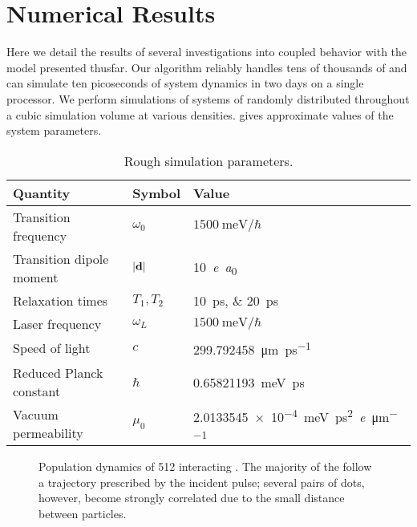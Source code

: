 \section{Numerical Results}
Here we detail the results of several investigations into coupled \qd{} behavior with the model presented thusfar.
Our algorithm reliably handles tens of thousands of \qds{} and can simulate ten picoseconds of system dynamics in two days on a single processor.
We perform simulations of systems of \qds{} randomly distributed throughout a cubic simulation volume at various densities.
 gives approximate values of the system parameters.

\begin{table}
  \begin{ruledtabular}
    \begin{tabular}{lll}
      Quantity                 & Symbol         & Value                        \\ \hline
      Transition frequency     & $\omega_0$     & $\SI{1500}{\milli\eV}/\hbar$ \\
      Transition dipole moment & $\abs{\vb{d}}$ & \SI{10}{\elementarycharge\bohr} \\
      Relaxation times         & $T_{1}, T_{2}$ & \SIlist{10;20}{\pico\second} \\
      Laser frequency          & $\omega_L$     & $\SI{1500}{\milli\eV}/\hbar$ \\ \hline
      Speed of light           & $c$            & \SI{299.792458}{\micro\meter\per\pico\second} \\
      Reduced Planck constant  & $\hbar$        & \SI{0.65821193}{\milli\eV \pico\second} \\
      Vacuum permeability      & $\mu_0$        & \SI{2.0133545e-4}{\milli\eV \pico\second\squared \per \elementarycharge \per \micro\meter}
    \end{tabular}
  \end{ruledtabular}
  \caption{\label{table:parameters}Rough simulation parameters.}
\end{table}

\begin{figure}
  
  \caption{\label{fig:population dynamics}Population dynamics of 512 interacting \qds{}.
    The majority of the \qds{} follow a trajectory prescribed by the incident pulse; several pairs of dots, however, become strongly correlated due to the small distance between particles.
  }
\end{figure}

